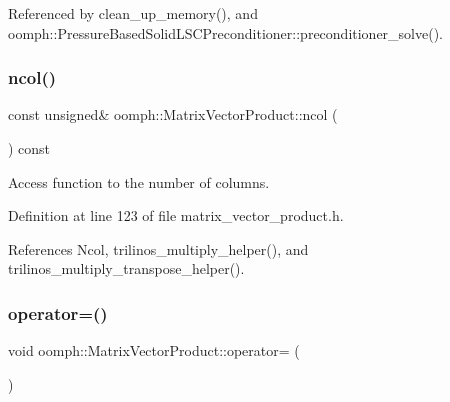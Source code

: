 Referenced by clean\+\_\+up\+\_\+memory(), and oomph\+::\+Pressure\+Based\+Solid\+L\+S\+C\+Preconditioner\+::preconditioner\+\_\+solve().

\mbox{\label{classoomph_1_1MatrixVectorProduct_ab50c3dc351cd11050a979d30e421836f}} 
\subsubsection{\texorpdfstring{ncol()}{ncol()}}
{\footnotesize\ttfamily const unsigned\& oomph\+::\+Matrix\+Vector\+Product\+::ncol (\begin{DoxyParamCaption}{ }\end{DoxyParamCaption}) const\hspace{0.3cm}{\ttfamily [inline]}}



Access function to the number of columns. 



Definition at line 123 of file matrix\+\_\+vector\+\_\+product.\+h.



References Ncol, trilinos\+\_\+multiply\+\_\+helper(), and trilinos\+\_\+multiply\+\_\+transpose\+\_\+helper().

\mbox{\label{classoomph_1_1MatrixVectorProduct_a9abd4e1d4b91726a7f65a71dd74fefa8}} 
\subsubsection{\texorpdfstring{operator=()}{operator=()}}
{\footnotesize\ttfamily void oomph\+::\+Matrix\+Vector\+Product\+::operator= (\begin{DoxyParamCaption}\item[{const \hyperlink{classoomph_1_1MatrixVectorProduct}{Matrix\+Vector\+Product} \&}]{ }\end{DoxyParamCaption})\hspace{0.3cm}{\ttfamily [inline]}}



